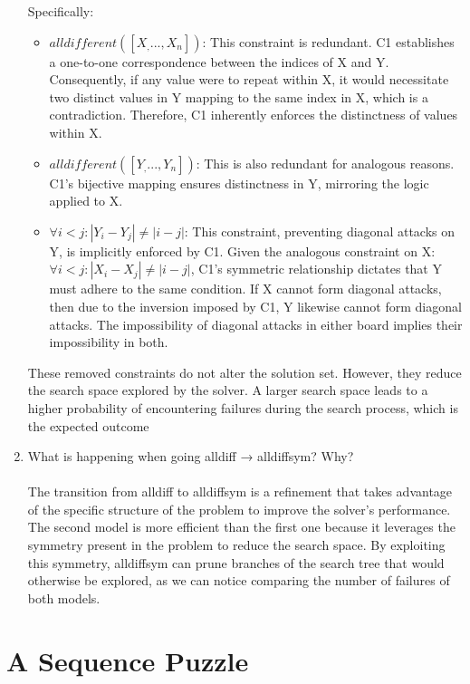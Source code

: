 \documentclass{article}
\begin{document}
\begin{enumerate}
    Specifically:
    \begin{itemize}
8        \item $alldifferent([X_, ..., X_n])$: This constraint is redundant. C1 establishes a one-to-one correspondence between the indices of X and Y. Consequently, if any value were to repeat within X, it would necessitate two distinct values in Y mapping to the same index in X, which is a contradiction. Therefore, C1 inherently enforces the distinctness of values within X.
        \item $alldifferent([Y_, ..., Y_n])$: This is also redundant for analogous reasons. C1's bijective mapping ensures distinctness in Y, mirroring the logic applied to X.
        \item $\forall i < j: |Y_i - Y_j| \neq |i - j|$: This constraint, preventing diagonal attacks on Y, is implicitly enforced by C1. Given the analogous constraint on X: $ \forall i < j: |X_i - X_j| \neq |i - j|$, C1's symmetric relationship dictates that Y must adhere to the same condition. If X cannot form diagonal attacks, then due to the inversion imposed by C1, Y likewise cannot form diagonal attacks. The impossibility of diagonal attacks in either board implies their impossibility in both.
    \end{itemize}
    These removed constraints do not alter the solution set. However, they reduce the search space explored by the solver. A larger search space leads to a higher probability of encountering failures during the search process, which is the expected outcome

  \item What is happening when going alldiff → alldiffsym? Why? \\ \\
  The transition from alldiff to alldiffsym is a refinement that takes advantage of the specific structure of the problem to improve the solver's performance. The second model is more efficient than the first one because it leverages the symmetry present in the problem to reduce the search space. By exploiting this symmetry, alldiffsym can prune branches of the search tree that would otherwise be explored, as we can notice comparing the number of failures of both models.
\end{enumerate}

\section{A Sequence Puzzle}
\end{document}
